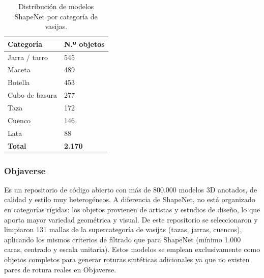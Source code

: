 \documentclass[10pt,a4paper]{report}
\begin{document}
\begin{table}[H]
  \centering
  \begin{threeparttable}
  \begin{tabular}{ll}
    \toprule
    Categoría & N.º objetos \\
    \midrule
    Jarra / tarro & 545 \\
    Maceta        & 489 \\
    Botella       & 453 \\
    Cubo de basura & 277 \\
    Taza          & 172 \\
    Cuenco        & 146 \\
    Lata          & 88 \\
    \midrule
    \textbf{Total} & \textbf{2.170} \\
    \bottomrule
  \end{tabular}
  \end{threeparttable}
  \caption{Distribución de modelos ShapeNet por categoría de vasijas.}
  \label{tab:shapenet}
\end{table}


\subsubsection*{Objaverse \textnormal{\citep{deitke2023objaverse}}}
Es un repositorio de código abierto con más de 800.000 modelos 3D anotados, de calidad
y estilo muy heterogéneos.
A diferencia de ShapeNet, no está organizado en categorías rígidas: los objetos provienen
de artistas y estudios de diseño, lo que aporta mayor variedad geométrica y visual.
De este repositorio se seleccionaron y limpiaron 131 mallas de la supercategoría de
vasijas (tazas, jarras, cuencos), aplicando los mismos criterios de filtrado que para ShapeNet (mínimo 1.000 caras, centrado y escala unitaria).
Estos modelos se emplean exclusivamente como objetos completos para generar roturas
sintéticas adicionales ya que no existen pares de rotura reales en Objaverse.
\end{document}
